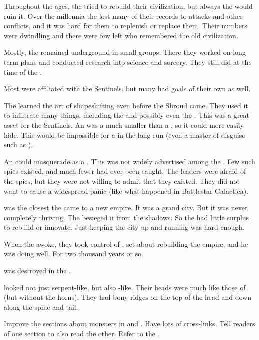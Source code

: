 Throughout the ages, the \ophidians tried to rebuild their civilization, but always the \noggyaleth would ruin it.
Over the millennia the \ophidians lost many of their records to \noggyal attacks and other conflicts, and it was hard for them to replenish or replace them.
Their numbers were dwindling and there were few left who remembered the old \ophidian civilization. 

Mostly, the \ophidians remained underground in small groups.
There they worked on long-term plans and conducted research into science and sorcery. 
They still did at the time of the \thirdbanewar. 

Most \ophidians were affiliated with the Sentinels, but many had goals of their own as well.

The \ophidians learned the art of shapeshifting even before the Shroud came. 
They used it to infiltrate many things, including the \aryothim and possibly even the \resphain. 
This was a great asset for the Sentinels. 
An \ophidian was a much smaller \vertex than a \dragon, so it could more easily hide.
This would be impossible for a \dragon in the long run (even a master of disguise such as \Nzessuacrith). 

An \ophidian could masquerade as a \bezed. 
This was not widely advertised among the \resphain.
Few such spies existed, and much fewer had ever been caught. 
The \resphan leaders were afraid of the spies, but they were not willing to admit that they existed.
They did not want to cause a widespread panic (like what happened in Battlestar Galactica).

\Saphyrae was the closest the \ophidians came to a new empire. 
It was a grand city.
But it was never completely thriving. 
The \noggyaleth besieged it from the shadows. 
So the \ophidians had little surplus to rebuild or innovate. 
Just keeping the city up and running was hard enough. 

When the \dragons awoke, they took control of \Saphyrae. 
\Nexagglachel set about rebuilding the \ophidian empire, and he was doing well. 
For two thousand years or so. 

\Saphyrae was destroyed in the \secondbanewar. 


\Ophidians looked not just serpent-like, but also \dragon-like. 
Their heads were much like those of \dragons (but without the horns). 
They had bony ridges on the top of the head and down along the spine and tail. 


Improve the sections about monsters in \Nyx and \Erebos. 
Have lots of cross-links.
Tell readers of one section to also read the other. 
Refer to the \flyingpolyps. 



